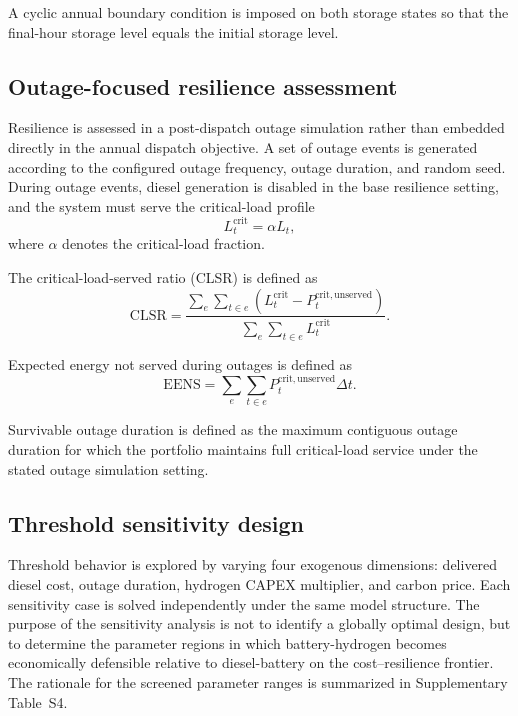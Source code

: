 \documentclass[preprint,12pt]{elsarticle}
\begin{document}
A cyclic annual boundary condition is imposed on both storage states so that the final-hour storage level equals the initial storage level.

\subsection{Outage-focused resilience assessment}

Resilience is assessed in a post-dispatch outage simulation rather than embedded directly in the annual dispatch objective. A set of outage events is generated according to the configured outage frequency, outage duration, and random seed. During outage events, diesel generation is disabled in the base resilience setting, and the system must serve the critical-load profile
\begin{equation}
L^{\mathrm{crit}}_t = \alpha L_t,
\end{equation}
where $\alpha$ denotes the critical-load fraction.

The critical-load-served ratio (CLSR) is defined as
\begin{equation}
\mathrm{CLSR}
=
\frac{\sum_{e}\sum_{t \in e} \left(L^{\mathrm{crit}}_t - P^{\mathrm{crit,unserved}}_t\right)}
{\sum_{e}\sum_{t \in e} L^{\mathrm{crit}}_t }.
\end{equation}

Expected energy not served during outages is defined as
\begin{equation}
\mathrm{EENS}
=
\sum_{e}\sum_{t \in e} P^{\mathrm{crit,unserved}}_t \Delta t.
\end{equation}

Survivable outage duration is defined as the maximum contiguous outage duration for which the portfolio maintains full critical-load service under the stated outage simulation setting.

\subsection{Threshold sensitivity design}

Threshold behavior is explored by varying four exogenous dimensions: delivered diesel cost, outage duration, hydrogen CAPEX multiplier, and carbon price. Each sensitivity case is solved independently under the same model structure. The purpose of the sensitivity analysis is not to identify a globally optimal design, but to determine the parameter regions in which battery-hydrogen becomes economically defensible relative to diesel-battery on the cost--resilience frontier. The rationale for the screened parameter ranges is summarized in Supplementary Table~S4.
\end{document}
